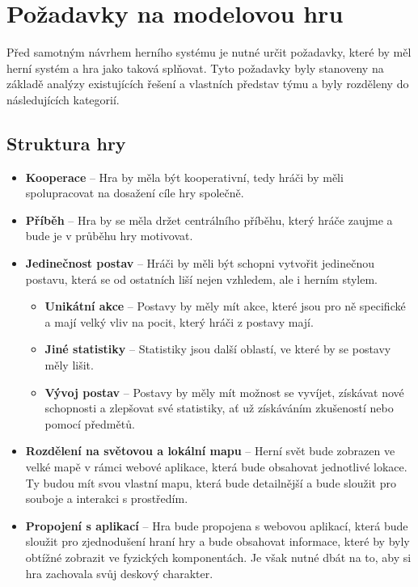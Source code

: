 \chapter{Požadavky na modelovou hru}
\label{chap:requirements}

Před samotným návrhem herního systému je nutné určit požadavky, které by měl herní systém a hra jako taková splňovat. Tyto požadavky byly stanoveny na základě analýzy existujících řešení  a vlastních představ týmu a byly rozděleny do následujících kategorií.

\section{Struktura hry}
\label{sec:req_structure}

\begin{itemize}
    \item \textbf{Kooperace} -- 
        Hra by měla být kooperativní, tedy hráči by měli spolupracovat na dosažení cíle hry společně.
    \item \textbf{Příběh} -- 
        Hra by se měla držet centrálního příběhu, který hráče zaujme a bude je v průběhu hry motivovat.
    \item \textbf{Jedinečnost postav} -- 
        Hráči by měli být schopni vytvořit jedinečnou postavu, která se od ostatních liší nejen vzhledem, ale i herním stylem.

    \begin{itemize}
        \item \textbf{Unikátní akce} -- 
            Postavy by měly mít akce, které jsou pro ně specifické a mají velký vliv na pocit, který hráči z postavy mají.
        \item \textbf{Jiné statistiky} -- 
            Statistiky jsou další oblastí, ve které by se postavy měly lišit.
        \item \textbf{Vývoj postav} -- 
            Postavy by měly mít možnost se vyvíjet, získávat nové schopnosti a zlepšovat své statistiky, ať už získáváním zkušeností nebo pomocí předmětů.
    \end{itemize}

    \item \textbf{Rozdělení na světovou a lokální mapu} -- 
        Herní svět bude zobrazen ve velké mapě v rámci webové aplikace, která bude obsahovat jednotlivé lokace. Ty budou mít svou vlastní mapu, která bude detailnější a bude sloužit pro souboje a interakci s prostředím.
    \item \textbf{Propojení s aplikací} -- 
        Hra bude propojena s webovou aplikací, která bude sloužit pro zjednodušení hraní hry a bude obsahovat informace, které by byly obtížné zobrazit ve fyzických komponentách. Je však nutné dbát na to, aby si hra zachovala svůj deskový charakter.
\end{itemize}

